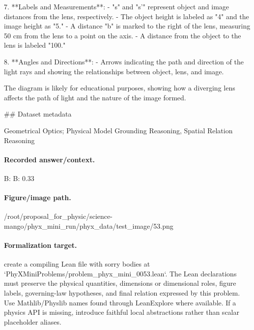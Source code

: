 7. **Labels and Measurements**:
   - "s" and "s'" represent object and image distances from the lens, respectively.
   - The object height is labeled as "4" and the image height as "5."
   - A distance "b" is marked to the right of the lens, measuring 50 cm from the lens to a point on the axis.
   - A distance from the object to the lens is labeled "100."

8. **Angles and Directions**:
   - Arrows indicating the path and direction of the light rays and showing the relationships between object, lens, and image.

The diagram is likely for educational purposes, showing how a diverging lens affects the path of light and the nature of the image formed.

\#\# Dataset metadata

Geometrical Optics; Physical Model Grounding Reasoning, Spatial Relation Reasoning

\paragraph{Recorded answer/context.}
B: B: 0.33

\paragraph{Figure/image path.}
/root/proposal\_for\_physic/science-mango/phyx\_mini\_run/phyx\_data/test\_image/53.png

\paragraph{Formalization target.}
create a compiling Lean file with sorry bodies at `PhyXMiniProblems/problem\_phyx\_mini\_0053.lean`. The Lean declarations must preserve the physical quantities, dimensions or dimensional roles, figure labels, governing-law hypotheses, and final relation expressed by this problem.
Use Mathlib/Physlib names found through LeanExplore where available. If a physics API is missing, introduce faithful local abstractions rather than scalar placeholder aliases.

